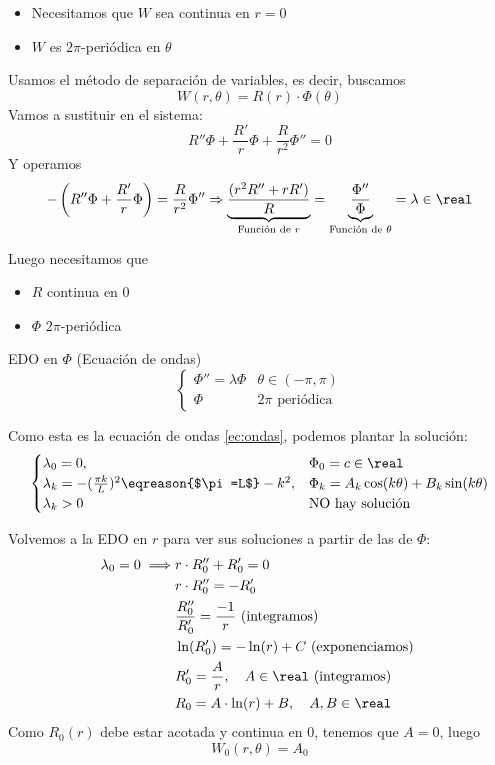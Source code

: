 		\begin{itemize}
			\item Necesitamos que $W$ sea continua en $r=0$
			\item $W$ es $2\pi$-periódica en $\theta$
		\end{itemize}

		Usamos el método de separación de variables, es decir, buscamos $$W(r, \theta) = R(r)\cdot \Phi(\theta)$$
		Vamos a sustituir en el sistema:
		\[R''\Phi + \frac{R'}{r}\Phi + \frac{R}{r^2} \Phi'' = 0 \]
		Y operamos
		\[ - \left( R'' \Phi + \frac{R'}{r}\Phi \right) = \frac{R}{r^2} \Phi'' \Rightarrow \underbrace{\frac{(r^2R''+rR')}{R}}_{\text{Función de }r} = \underbrace{\frac{\Phi''}{\Phi}}_{\text{Función de }\theta} = \lambda \in \real \]

		Luego necesitamos que
		\begin{itemize}
			\item $R$ continua en 0
			\item $\Phi$ $2\pi$-periódica
		\end{itemize}


		EDO en $\Phi$ (Ecuación de ondas)
		\[
			\begin{cases}
				\Phi'' = \lambda \Phi & \theta \in (-\pi, \pi) \\
				\Phi & 2\pi \text{ periódica }
			\end{cases}
		\]

		Como esta es la ecuación de ondas \ref{ec:ondas}, podemos plantar la solución:
		\[
			\begin{cases}
				\lambda_0 = 0,& \Phi_0 = c \in \real\\
				\lambda_k = -(\frac{\pi k}{L})^2 \eqreason{$\pi=L$} -k^2, & \Phi_k = A_k \cos (k\theta) + B_k \sin (k\theta)\\
				\lambda_k > 0 & \text{NO hay solución}
			\end{cases}
		\]

		Volvemos a la EDO en $r$ para ver sus soluciones a partir de las de $\Phi$:
		\begin{align*}
			\lambda_0 = 0 \implies & r\cdot R_0'' + R'_0 = 0\\
			& r\cdot R_0'' = - R'_0\\
			& \frac{R''_0}{R'_0} = \frac{-1}{r} \text{ (integramos) }\\
			& \ln(R'_0) = - \ln(r) + C \text{ (exponenciamos) }\\
			& R'_0 = \frac{A}{r}, \quad A \in \real \text{ (integramos) }\\
			& R_0 = A \cdot \ln(r) + B, \quad A,B \in \real
		\end{align*}
		Como $R_0(r)$ debe estar acotada y continua en 0, tenemos que $A = 0$, luego $$W_{0}(r, \theta) = A_0$$

